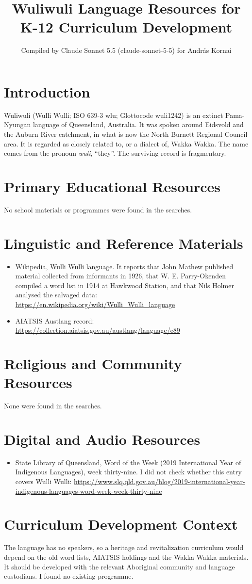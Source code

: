 \documentclass[12pt]{article}
\title{Wuliwuli Language Resources for K-12 Curriculum Development}
\author{Compiled by Claude Sonnet 5.5 (claude-sonnet-5-5) for Andr\'as Kornai}
\date{}
\begin{document}
\maketitle

\section{Introduction}
Wuliwuli (Wulli Wulli; ISO 639-3 wlu; Glottocode wuli1242) is an extinct Pama-Nyungan language of Queensland, Australia. It was spoken around Eidsvold and the Auburn River catchment, in what is now the North Burnett Regional Council area. It is regarded as closely related to, or a dialect of, Wakka Wakka. The name comes from the pronoun \emph{wuli}, ``they''. The surviving record is fragmentary.

\section{Primary Educational Resources}
No school materials or programmes were found in the searches.

\section{Linguistic and Reference Materials}
\begin{itemize}
\item Wikipedia, Wulli Wulli language. It reports that John Mathew published material collected from informants in 1926, that W. E. Parry-Okenden compiled a word list in 1914 at Hawkwood Station, and that Nils Holmer analysed the salvaged data: \url{https://en.wikipedia.org/wiki/Wulli_Wulli_language}
\item AIATSIS Austlang record: \url{https://collection.aiatsis.gov.au/austlang/language/e89}
\end{itemize}

\section{Religious and Community Resources}
None were found in the searches.

\section{Digital and Audio Resources}
\begin{itemize}
\item State Library of Queensland, Word of the Week (2019 International Year of Indigenous Languages), week thirty-nine. I did not check whether this entry covers Wulli Wulli: \url{https://www.slq.qld.gov.au/blog/2019-international-year-indigenous-languages-word-week-week-thirty-nine}
\end{itemize}

\section{Curriculum Development Context}
The language has no speakers, so a heritage and revitalization curriculum would depend on the old word lists, AIATSIS holdings and the Wakka Wakka materials. It should be developed with the relevant Aboriginal community and language custodians. I found no existing programme.
\end{document}
